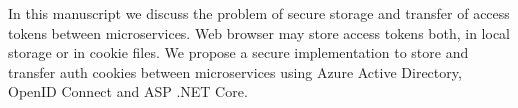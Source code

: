 In this manuscript we discuss the problem of secure storage and transfer of access tokens between microservices.
Web browser may store access tokens both, in local storage or in cookie files.
We propose a secure implementation to store and transfer auth cookies between microservices
using Azure Active Directory, OpenID Connect and ASP .NET Core.